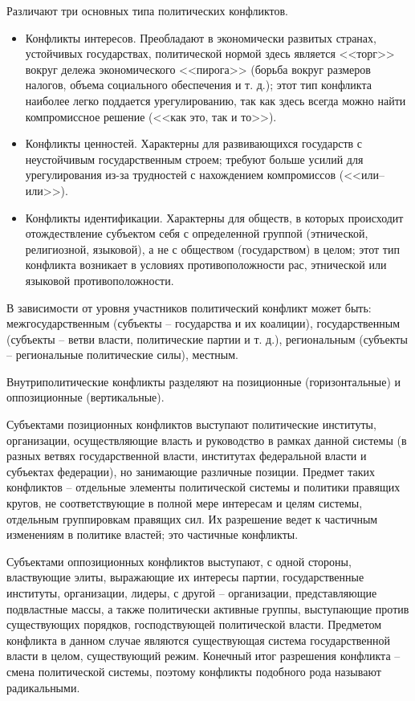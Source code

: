 Различают три основных типа политических конфликтов.
\begin{itemize}
    \item Конфликты интересов. Преобладают в экономически развитых странах,
    устойчивых государствах, политической нормой здесь является <<торг>> вокруг
    дележа экономического <<пирога>> (борьба вокруг размеров налогов, объема
    социального обеспечения и т. д.); этот тип конфликта наиболее легко
    поддается урегулированию, так как здесь всегда можно найти компромиссное
    решение (<<как это, так и то>>).
    \item Конфликты ценностей. Характерны для развивающихся государств с
    неустойчивым государственным строем; требуют больше усилий для
    урегулирования из-за трудностей с нахождением компромиссов (<<или--или>>).
    \item Конфликты идентификации. Характерны для обществ, в которых происходит
    отождествление субъектом себя с определенной группой (этнической,
    религиозной, языковой), а не с обществом (государством) в целом; этот тип
    конфликта возникает в условиях противоположности рас, этнической или
    языковой противоположности.
\end{itemize}

В зависимости от уровня участников политический конфликт может быть:
межгосударственным (субъекты -- государства и их коалиции), государственным
(субъекты -- ветви власти, политические партии и т. д.), региональным
(субъекты -- региональные политические силы), местным.

Внутриполитические конфликты разделяют на позиционные (горизонтальные) и
оппозиционные (вертикальные).

Субъектами позиционных конфликтов выступают политические институты,
организации, осуществляющие власть и руководство в рамках данной системы (в
разных ветвях государственной власти, институтах федеральной власти и
субъектах федерации), но занимающие различные позиции. Предмет таких
конфликтов -- отдельные элементы политической системы и политики правящих
кругов, не соответствующие в полной мере интересам и целям системы, отдельным
группировкам правящих сил. Их разрешение ведет к частичным изменениям в
политике властей; это частичные конфликты.

Субъектами оппозиционных конфликтов выступают, с одной стороны, властвующие
элиты, выражающие их интересы партии, государственные институты, организации,
лидеры, с другой -- организации, представляющие подвластные массы, а также
политически активные группы, выступающие против существующих порядков,
господствующей политической власти. Предметом конфликта в данном случае
являются существующая система государственной власти в целом, существующий
режим. Конечный итог разрешения конфликта -- смена политической системы,
поэтому конфликты подобного рода называют радикальными.

